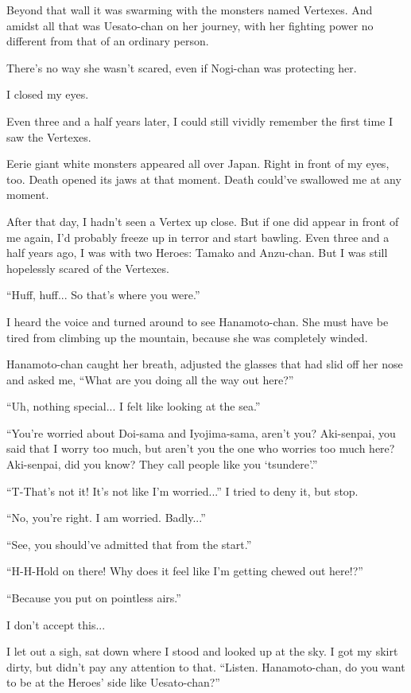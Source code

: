 Beyond that wall it was swarming with the monsters named Vertexes. And amidst all that was Uesato-chan on her journey, with her fighting power no different from that of an ordinary person.

There's no way she wasn't scared, even if Nogi-chan was protecting her.

I closed my eyes.

Even three and a half years later, I could still vividly remember the first time I saw the Vertexes.

Eerie giant white monsters appeared all over Japan. Right in front of my eyes, too. Death opened its jaws at that moment. Death could've swallowed me at any moment.

After that day, I hadn't seen a Vertex up close. But if one did appear in front of me again, I'd probably freeze up in terror and start bawling. Even three and a half years ago, I was with two Heroes: Tamako and Anzu-chan. But I was still hopelessly scared of the Vertexes.

``Huff, huff... So that's where you were.''

I heard the voice and turned around to see Hanamoto-chan. She must have be tired from climbing up the mountain, because she was completely winded.

Hanamoto-chan caught her breath, adjusted the glasses that had slid off her nose and asked me, ``What are you doing all the way out here?''

``Uh, nothing special... I felt like looking at the sea.''

``You're worried about Doi-sama and Iyojima-sama, aren't you? Aki-senpai, you said that I worry too much, but aren't you the one who worries too much here? Aki-senpai, did you know? They call people like you `tsundere'.''

``T-That's not it! It's not like I'm worried...'' I tried to deny it, but stop.

``No, you're right. I am worried. Badly...''

``See, you should've admitted that from the start.''

``H-H-Hold on there! Why does it feel like I'm getting chewed out here!?''

``Because you put on pointless airs.''

I don't accept this...

I let out a sigh, sat down where I stood and looked up at the sky. I got my skirt dirty, but didn't pay any attention to that.  ``Listen. Hanamoto-chan, do you want to be at the Heroes' side like Uesato-chan?''

